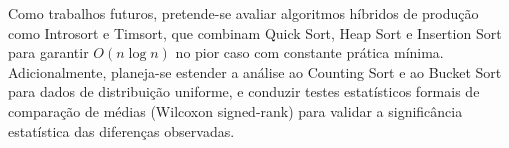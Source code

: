 \documentclass[12pt]{article}
\begin{document}
Como trabalhos futuros, pretende-se avaliar algoritmos híbridos de
produção como Introsort e Timsort, que combinam Quick Sort, Heap Sort
e Insertion Sort para garantir $O(n \log n)$ no pior caso com
constante prática mínima. Adicionalmente, planeja-se estender a
análise ao Counting Sort e ao Bucket Sort para dados de distribuição
uniforme, e conduzir testes estatísticos formais de comparação de
médias (Wilcoxon signed-rank) para validar a significância estatística
das diferenças observadas.



\end{document}
